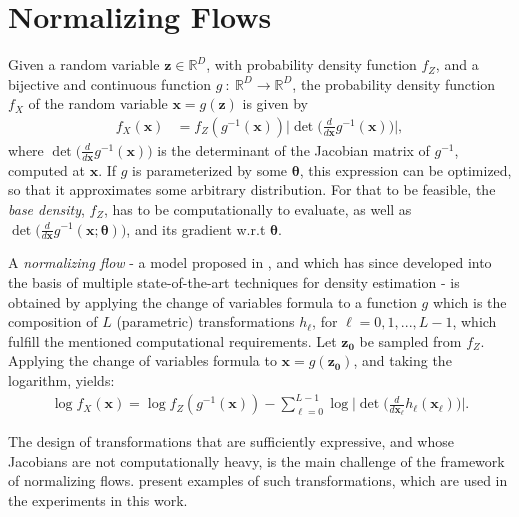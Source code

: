 \section{Normalizing Flows}
\label{cov}
Given a random variable $\bm{z} \in \mathbb{R}^D$, with probability density function $f_Z$,
and a bijective and continuous function $g\: : \: \mathbb{R}^D\rightarrow \mathbb{R}^D$,
the probability density function $f_X$ of the random variable $\bm{x} = g(\bm{z})$ is given by
\begin{align}
    f_X(\bm{x}) &= f_Z(g^{-1}(\bm{x}))\Big|\det\Big(\frac{d}{d\bm{x}}g^{-1}(\bm{x})\Big)\Big|,
\end{align} where $\det\Big(\frac{d}{d\bm{x}}g^{-1}(\bm{x})\Big)$
is the determinant of the Jacobian matrix of $g^{-1}$, computed at $\bm{x}$.
If $g$ is parameterized by some $\bm\theta$,
this expression can be optimized, so that it approximates some arbitrary distribution.
For that to be feasible, the \emph{base density}, $f_Z$, has to be computationally  to evaluate,
as well as $\det\Big(\frac{d}{d\bm{x}}g^{-1}(\bm{x};\bm\theta)\Big)$, and its gradient w.r.t
$\bm\theta$.

A \emph{normalizing flow} - a model proposed in \autocite{shakir_nf}, and which
has since developed into the basis of multiple state-of-the-art techniques for
density estimation \autocites{Glow}{real-nvp}{bnaf19}{maf} - is obtained by
applying the change of variables formula to a function $g$ which is the composition
of $L$ (parametric) transformations $h_\ell$, for ${\ell = 0, 1, ..., L-1}$, which
fulfill the mentioned computational requirements.
Let $\bm{z_0}$ be sampled from $f_Z$. Applying the change of variables formula
to $\bm{x} = g(\bm{z_0})$, and taking the logarithm, yields:
\begin{align}
    \log f_X(\bm{x}) = \log f_Z(g^{-1}(\bm{x})) - \sum_{\ell=0}^{L-1} \log \Big|\det\Big(\frac{d}{d\bm{x_{\ell}}}h_{\ell}(\bm{x_\ell})\Big) \Big|. \label{eq:nflowsfinal}
\end{align}

The design of transformations that are sufficiently expressive, and whose Jacobians
are not computationally heavy, is the main challenge of the framework of normalizing
flows. \textcites{real-nvp}{maf} present examples of such transformations, which
are used in the experiments in this work.

